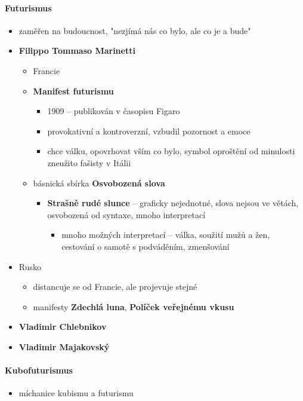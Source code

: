 \paragraph{Futurismus}
\begin{itemize}
\item zaměřen na budoucnost, "nezjímá nás co bylo, ale co je a bude"
\item \textbf{Filippo Tommaso Marinetti}
	\begin{itemize}
	\item Francie
	\item \textbf{Manifest futurismu}
		\begin{itemize}
	 	\item 1909 -- publikován v časopisu Figaro
	 	\item provokativní a kontroverzní, vzbudil pozornost a emoce
		\item chce válku, opovrhovat vším co bylo, symbol oproštění od minulosti \ra zneužito fašisty v Itálii
		\end{itemize}
	\item básnická sbírka \textbf{Osvobozená slova}
		\begin{itemize}
		\item \textbf{Strašně rudé slunce} -- graficky nejednotné, slova nejsou ve větách, osvobozená od syntaxe, mnoho interpretací
			\begin{itemize}
			\item mnoho možných interpretací -- válka, soužití mužů a žen, cestování o samotě s podváděním, zmenšování
			\end{itemize}
		\end{itemize}
	\end{itemize}
\item Rusko
	\begin{itemize}
	\item distancuje se od Francie, ale projevuje stejné
	\item manifesty \textbf{Zdechlá luna}, \textbf{Políček veřejnému vkusu}
	\end{itemize}
	\item \textbf{Vladimir Chlebnikov}
	\item \textbf{Vladimir Majakovský}
\end{itemize}

\paragraph{Kubofuturismus}
\begin{itemize}
\item míchanice kubismu a futurismu
\end{itemize}


